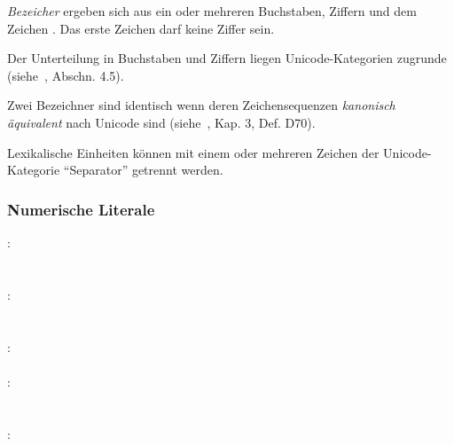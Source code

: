 \emph{Bezeicher} ergeben sich aus ein oder mehreren Buchstaben, Ziffern und dem Zeichen \glq\kw{\_}\grq. Das erste Zeichen
darf keine Ziffer sein.

Der Unterteilung in Buchstaben und Ziffern liegen Unicode-Kategorien zugrunde (siehe~\cite{unicode}, Abschn. 4.5).

Zwei Bezeichner sind identisch wenn deren Zeichensequenzen \emph{kanonisch äquivalent} nach Unicode sind (siehe~\cite{unicode}, Kap. 3, Def. D70).

Lexikalische Einheiten können mit einem oder mehreren Zeichen der Unicode-Kategorie "`Separator"' getrennt werden.


\subsubsection{Numerische Literale}\label{Numerische Literale}
:\label{Numbers}\\
\hspace*{1cm} \\
\hspace*{1cm}  \\
:\label{Numbers_Sign}\\
\hspace*{1cm}  \\
\hspace*{1cm}\glq\Gt{-}\grq  {} \\
:\label{Numbers_Frac}\\
\hspace*{1cm}\glq{}\grq  {} \\
:\label{Num_Float_Exp}\\
\hspace*{1cm}\glq{}\grq  {} \\
\hspace*{1cm}\glq{}\grq  {} \\
:\label{Num_Float}\\
\hspace*{1cm} \\
